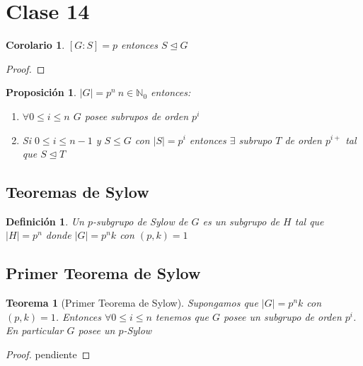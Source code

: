 \documentclass[10pt]{extarticle}
\theoremstyle{break}
\newtheorem{theorem}{Teorema}[section]
\newtheorem{corollary}{Corolario}[theorem]
\newtheorem{proposition}{Proposición}
\newtheorem{definition}{Definición}[section]
\theoremstyle{definition}
\begin{document}
\section{Clase 14}

\begin{corollary}
	$ [G:S]=p $ entonces $ S \trianglelefteq G $
\end{corollary}
\begin{proof}
	
\end{proof}

\begin{proposition}
	$ |G|=p^{n} \ n\in \mathbb{N}_{0} $ entonces:
	\begin{enumerate}
		\item $ \forall 0\leq i\leq n$ $ G $ posee subrupos de orden $ p^{i} $
		\item Si $0\leq i\leq n-1$ y $S\leq G$ con $|S|=p^{i}$ entonces $\exists $ subrupo $T$ de orden $p^{i+}$ tal que $S \trianglelefteq T$ 
	\end{enumerate}
\end{proposition}


\subsection{Teoremas de Sylow}

\begin{definition}
	Un $p$-subgrupo de Sylow de $G$ es un subgrupo de $H$  tal que $\lvert H \rvert =p^{n}$ donde $\lvert G \rvert =p^{n}k$ con $(p,k)=1$ 
\end{definition}

\subsection{Primer Teorema de Sylow}
\begin{theorem}[Primer Teorema de Sylow] \label{14.1}
	Supongamos que $\lvert G \rvert =p^{n}k$ con $(p,k)=1$. Entonces $\forall 0\leq i\leq n$ tenemos que $G$ posee un subgrupo de orden $p^{i}$. En particular $G$ posee un $p$-Sylow 
\end{theorem}
\begin{proof}
	pendiente  
\end{proof}
\end{document}
